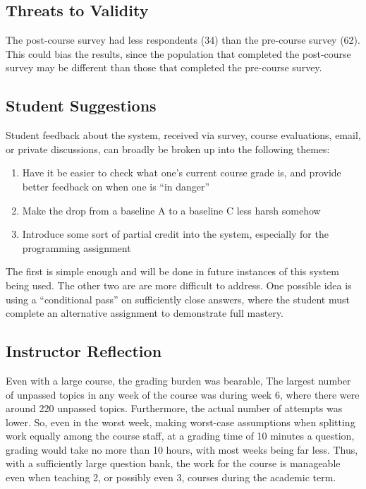 \documentclass{article}
\begin{document}
\subsection{Threats to Validity}
The post-course survey had less respondents (34) than the pre-course survey (62). This could bias the results, since the population that completed the post-course survey may be different than those that completed the pre-course survey.

\subsection{Student Suggestions}
Student feedback about the system, received via survey, course evaluations, email, or private discussions, can broadly be broken up into the following themes:

\begin{enumerate}
    \item Have it be easier to check what one's current course grade is, and provide better feedback on when one is ``in danger''
    \item Make the drop from a baseline A to a baseline C less harsh somehow
    \item Introduce some sort of partial credit into the system, especially for the programming assignment
\end{enumerate}

The first is simple enough and will be done in future instances of this system being used. The other two are are more difficult to address. One possible idea is using a ``conditional pass'' on sufficiently close answers, where the student must complete an alternative assignment to demonstrate full mastery.

\subsection{Instructor Reflection}
Even with a large course, the grading burden was bearable, The largest number of unpassed topics in any week of the course was during week 6, where there were around 220 unpassed topics. Furthermore, the actual number of attempts was lower. So, even in the worst week, making worst-case assumptions when splitting work equally among the course staff, at a grading time of 10 minutes a question, grading would take no more than 10 hours, with most weeks being far less. Thus, with a sufficiently large question bank, the work for the course is manageable even when teaching 2, or possibly even 3, courses during the academic term.
\end{document}
